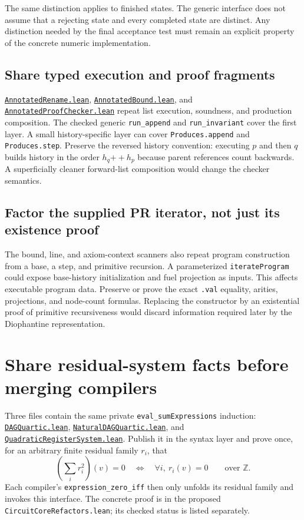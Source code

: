 \documentclass[11pt,letterpaper]{article}
\newcommand{\code}[1]{\nolinkurl{#1}}
\newcommand{\src}[2]{\href{https://github.com/VladimirReshetnikov/ProveIt/blob/60e9c5d620c6c387d932876cfa2d9376f64ea56c/Computability/DiophantineConsistency/Lean/DiophantineConsistency/#1.lean}{\code{#1.lean}}#2}
\begin{document}
The same distinction applies to finished states. The generic interface does
not assume that a rejecting state and every completed state are distinct.
Any distinction needed by the final acceptance test must remain an explicit
property of the concrete numeric implementation.

\subsection{Share typed execution and proof fragments}

\src{AnnotatedRename}{, }
\src{AnnotatedBound}{, and }
\src{AnnotatedProofChecker}{ repeat list execution, soundness, and production
composition.}
The checked generic \code{run_append} and \code{run_invariant} cover the
first layer. A small history-specific layer can cover \code{Produces.append}
and \code{Produces.step}. Preserve the reversed history convention: executing
$p$ and then $q$ builds history in the order $h_q\mathbin{++}h_p$ because parent
references count backwards. A superficially cleaner forward-list composition
would change the checker semantics.

\subsection{Factor the supplied PR iterator, not just its existence proof}

The bound, line, and axiom-context scanners also repeat program construction
from a base, a step, and primitive recursion. A parameterized
\code{iterateProgram} could expose base-history initialization and fuel
projection as inputs. This affects executable program data. Preserve or prove
the exact \code{.val} equality, arities, projections, and node-count formulas.
Replacing the constructor by an existential proof of primitive recursiveness
would discard information required later by the Diophantine representation.

\section{Share residual-system facts before merging compilers}
\label{sec:squares}

Three files contain the same private \code{eval_sumExpressions} induction:
\src{DAGQuartic}{, }
\src{NaturalDAGQuartic}{, and }
\src{QuadraticRegisterSystem}{.}
Publish it in the syntax layer and prove once, for an arbitrary finite
residual family $r_i$, that
\[
 \left(\sum_i r_i^2\right)(v)=0
 \quad\Longleftrightarrow\quad
 \forall i,\ r_i(v)=0
 \qquad\text{over }\mathbb Z.
\]
Each compiler's \code{expression_zero_iff} then only unfolds its residual
family and invokes this interface. The concrete proof is in the proposed
\code{CircuitCoreRefactors.lean}; its checked status is listed separately.
\end{document}

